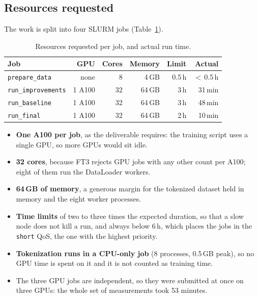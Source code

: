 \documentclass[10pt,a4paper,twocolumn]{article}
\begin{document}
\subsection{Resources requested}

The work is split into four SLURM jobs (Table~\ref{tab:resources}).

\begin{table}[H]
\centering\footnotesize
\setlength{\tabcolsep}{3.5pt}
\caption{Resources requested per job, and actual run time.}
\label{tab:resources}
\begin{tabular}{@{}lrrrrr@{}}
\toprule
Job & GPU & Cores & Memory & Limit & Actual \\
\midrule
\texttt{prepare\_data} & none & 8 & 4\,GB & 0.5\,h & $<$\,0.5\,h \\
\texttt{run\_improvements} & 1 A100 & 32 & 64\,GB & 3\,h & 31\,min \\
\texttt{run\_baseline} & 1 A100 & 32 & 64\,GB & 3\,h & 48\,min \\
\texttt{run\_final} & 1 A100 & 32 & 64\,GB & 2\,h & 10\,min \\
\bottomrule
\end{tabular}
\end{table}

\begin{itemize}
  \item \textbf{One A100 per job}, as the deliverable requires: the training script uses a
        single GPU, so more GPUs would sit idle.
  \item \textbf{32 cores}, because FT3 rejects GPU jobs with any other count per A100; eight
        of them run the DataLoader workers.
  \item \textbf{64\,GB of memory}, a generous margin for the tokenized dataset held in memory
        and the eight worker processes.
  \item \textbf{Time limits} of two to three times the expected duration, so that a slow node
        does not kill a run, and always below 6\,h, which places the jobs in the
        \texttt{short} QoS, the one with the highest priority.
  \item \textbf{Tokenization runs in a CPU-only job} (8 processes, 0.5\,GB peak), so no GPU
        time is spent on it and it is not counted as training time.
  \item The three GPU jobs are independent, so they were submitted at once on three GPUs: the
        whole set of measurements took 53 minutes.
\end{itemize}
\end{document}
